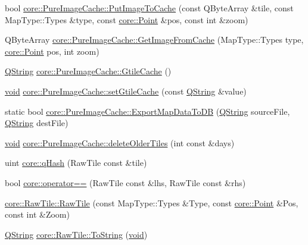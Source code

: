 \begin{DoxyCompactItemize}
bool \hyperlink{group___o_p_map_widget_gaabe1bf4c819005ff575270660c86503e}{core\-::\-Pure\-Image\-Cache\-::\-Put\-Image\-To\-Cache} (const \-Q\-Byte\-Array \&tile, const \-Map\-Type\-::\-Types \&type, const \hyperlink{structcore_1_1_point}{core\-::\-Point} \&pos, const int \&zoom)
\item 
\-Q\-Byte\-Array \hyperlink{group___o_p_map_widget_gae7df6a861aa9bec0d6cb196ef1de84b1}{core\-::\-Pure\-Image\-Cache\-::\-Get\-Image\-From\-Cache} (\-Map\-Type\-::\-Types type, \hyperlink{structcore_1_1_point}{core\-::\-Point} pos, int zoom)
\item 
\hyperlink{group___u_a_v_objects_plugin_gab9d252f49c333c94a72f97ce3105a32d}{\-Q\-String} \hyperlink{group___o_p_map_widget_ga30cc962d96388e3769ca3807c35d84ed}{core\-::\-Pure\-Image\-Cache\-::\-Gtile\-Cache} ()
\item 
\hyperlink{group___u_a_v_objects_plugin_ga444cf2ff3f0ecbe028adce838d373f5c}{void} \hyperlink{group___o_p_map_widget_gaf4e3245a367b45b888ca368f03ae9300}{core\-::\-Pure\-Image\-Cache\-::set\-Gtile\-Cache} (const \hyperlink{group___u_a_v_objects_plugin_gab9d252f49c333c94a72f97ce3105a32d}{\-Q\-String} \&value)
\item 
static bool \hyperlink{group___o_p_map_widget_ga4cd3a5c37b5805594bf922e266312836}{core\-::\-Pure\-Image\-Cache\-::\-Export\-Map\-Data\-To\-D\-B} (\hyperlink{group___u_a_v_objects_plugin_gab9d252f49c333c94a72f97ce3105a32d}{\-Q\-String} source\-File, \hyperlink{group___u_a_v_objects_plugin_gab9d252f49c333c94a72f97ce3105a32d}{\-Q\-String} dest\-File)
\item 
\hyperlink{group___u_a_v_objects_plugin_ga444cf2ff3f0ecbe028adce838d373f5c}{void} \hyperlink{group___o_p_map_widget_ga1ae13fc8322336ab8de6f1c6ad09793c}{core\-::\-Pure\-Image\-Cache\-::delete\-Older\-Tiles} (int const \&days)
\item 
uint \hyperlink{group___o_p_map_widget_ga45a81278b07bda2f00748b2eb7f10e01}{core\-::q\-Hash} (\-Raw\-Tile const \&tile)
\item 
bool \hyperlink{group___o_p_map_widget_ga17ed512ed98b14303d6db91fc1624c5e}{core\-::operator==} (\-Raw\-Tile const \&lhs, \-Raw\-Tile const \&rhs)
\item 
\hyperlink{group___o_p_map_widget_ga6ea25b848193120014a2b04afbdf8913}{core\-::\-Raw\-Tile\-::\-Raw\-Tile} (const \-Map\-Type\-::\-Types \&\-Type, const \hyperlink{structcore_1_1_point}{core\-::\-Point} \&\-Pos, const int \&\-Zoom)
\item 
\hyperlink{group___u_a_v_objects_plugin_gab9d252f49c333c94a72f97ce3105a32d}{\-Q\-String} \hyperlink{group___o_p_map_widget_gaf820aab5311f0f43e2e64399dcb65ef7}{core\-::\-Raw\-Tile\-::\-To\-String} (\hyperlink{group___u_a_v_objects_plugin_ga444cf2ff3f0ecbe028adce838d373f5c}{void})

\end{DoxyCompactItemize}
